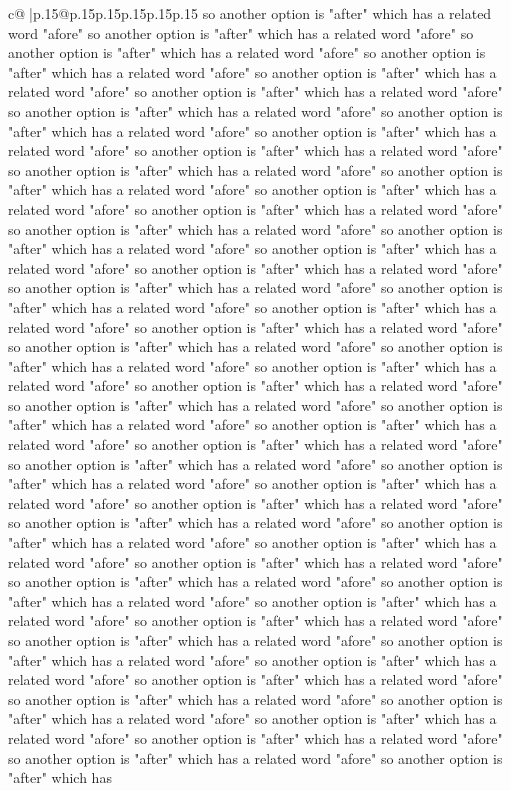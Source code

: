 \documentclass{article}
\begin{document}
{\begin{supertabular}{c@{$\;$}|p{.15\linewidth}@{}p{.15\linewidth}p{.15\linewidth}p{.15\linewidth}p{.15\linewidth}p{.15\linewidth}}
{{{so another option is "after" which has a related word "afore" so another option is "after" which has a related word "afore" so another option is "after" which has a related word "afore" so another option is "after" which has a related word "afore" so another option is "after" which has a related word "afore" so another option is "after" which has a related word "afore" so another option is "after" which has a related word "afore" so another option is "after" which has a related word "afore" so another option is "after" which has a related word "afore" so another option is "after" which has a related word "afore" so another option is "after" which has a related word "afore" so another option is "after" which has a related word "afore" so another option is "after" which has a related word "afore" so another option is "after" which has a related word "afore" so another option is "after" which has a related word "afore" so another option is "after" which has a related word "afore" so another option is "after" which has a related word "afore" so another option is "after" which has a related word "afore" so another option is "after" which has a related word "afore" so another option is "after" which has a related word "afore" so another option is "after" which has a related word "afore" so another option is "after" which has a related word "afore" so another option is "after" which has a related word "afore" so another option is "after" which has a related word "afore" so another option is "after" which has a related word "afore" so another option is "after" which has a related word "afore" so another option is "after" which has a related word "afore" so another option is "after" which has a related word "afore" so another option is "after" which has a related word "afore" so another option is "after" which has a related word "afore" so another option is "after" which has a related word "afore" so another option is "after" which has a related word "afore" so another option is "after" which has a related word "afore" so another option is "after" which has a related word "afore" so another option is "after" which has a related word "afore" so another option is "after" which has a related word "afore" so another option is "after" which has a related word "afore" so another option is "after" which has a related word "afore" so another option is "after" which has a related word "afore" so another option is "after" which has a related word "afore" so another option is "after" which has a related word "afore" so another option is "after" which has a related word "afore" so another option is "after" which has a related word "afore" so another option is "after" which has a related word "afore" so another option is "after" which has a related word "afore" so another option is "after" which has a related word "afore" so another option is "after" which has a related word "afore" so another option is "after" which has a related word "afore" so another option is "after" which has a related word "afore" so another option is "after" which has a related word "afore" so another option is "after" which has a related word "afore" so another option is "after" which has }}}
\end{supertabular}}
\end{document}
